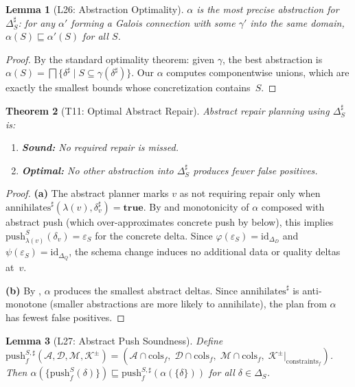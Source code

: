 \documentclass[11pt,a4paper]{article}
\newtheorem{theorem}{Theorem}[section]
\newtheorem{lemma}[theorem]{Lemma}
\theoremstyle{definition}
\newcommand{\DeltaS}{\Delta_{\!S}}
\newcommand{\DeltaD}{\Delta_{\!D}}
\newcommand{\DeltaQ}{\Delta_{\!Q}}
\newcommand{\epsS}{\varepsilon_S}
\newcommand{\push}{\mathrm{push}}
\newcommand{\ann}{\mathrm{annihilates}}
\begin{document}
\begin{lemma}[L26: Abstraction Optimality]\label{lem:galois-optimal}
$\alpha$ is the most precise abstraction for $\DeltaS^\sharp$: for any
$\alpha'$ forming a Galois connection with some $\gamma'$ into the same domain,
$\alpha(S) \sqsubseteq \alpha'(S)$ for all $S$.
\end{lemma}

\begin{proof}
By the standard optimality theorem: given $\gamma$, the best abstraction is
$\alpha(S) = \bigsqcap\{\delta^\sharp \mid S \subseteq \gamma(\delta^\sharp)\}$.
Our $\alpha$ computes componentwise unions, which are exactly the smallest
bounds whose concretization contains~$S$.
\end{proof}

\begin{theorem}[T11: Optimal Abstract Repair]\label{thm:abstract-repair}
Abstract repair planning using $\DeltaS^\sharp$ is:
\begin{enumerate}[label=(\alph*)]
  \item \textbf{Sound:} No required repair is missed.
  \item \textbf{Optimal:} No other abstraction into $\DeltaS^\sharp$ produces
    fewer false positives.
\end{enumerate}
\end{theorem}

\begin{proof}
\textbf{(a)} The abstract planner marks $v$ as not requiring repair only when
$\ann^\sharp(\lambda(v), \delta_v^\sharp) = \mathbf{true}$.  By
 and monotonicity of $\alpha$ composed with abstract push
(which over-approximates concrete push by  below),
this implies $\push_{\lambda(v)}^S(\delta_v) = \epsS$ for the concrete delta.
Since $\varphi(\epsS) = \mathrm{id}_{\DeltaD}$ and
$\psi(\epsS) = \mathrm{id}_{\DeltaQ}$, the schema change induces no additional
data or quality deltas at~$v$.

\textbf{(b)} By , $\alpha$ produces the smallest abstract
deltas.  Since $\ann^\sharp$ is anti-monotone (smaller abstractions are more
likely to annihilate), the plan from $\alpha$ has fewest false positives.
\end{proof}

\begin{lemma}[L27: Abstract Push Soundness]\label{lem:abstract-push-sound}
Define $\push_f^{S,\sharp}(\mathcal{A}, \mathcal{D}, \mathcal{M}, \mathcal{K}^\pm)
= (\mathcal{A} \cap \mathrm{cols}_f,\;
   \mathcal{D} \cap \mathrm{cols}_f,\;
   \mathcal{M} \cap \mathrm{cols}_f,\;
   \mathcal{K}^\pm|_{\mathrm{constraints}_f})$.
Then $\alpha(\{\push_f^S(\delta)\}) \sqsubseteq
\push_f^{S,\sharp}(\alpha(\{\delta\}))$ for all $\delta \in \DeltaS$.
\end{lemma}
\end{document}
